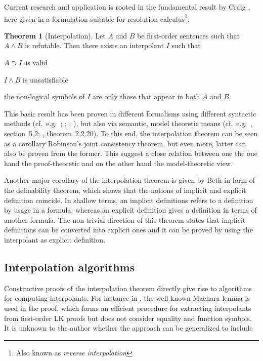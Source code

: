\documentclass[,%
			paper=a4,%
			DIV12,
			liststotoc,
			bibtotoc,
			draft=false,%
			numbers=noendperiod
			]{scrartcl}
\theoremstyle{definition}
\newtheorem{thm}{Theorem}
\begin{document}
Current research and application is rooted in the fundamental result by Craig \cite{craig57linear}, here given in a formulation suitable for resolution calculus\footnote{Also known as \emph{reverse interpolation}}:

\begin{thm}[Interpolation]
	Let $A$ and $B$ be first-order sentences such that $A \land B$ is refutable. 
	Then there exists an interpolant $I$ such that
	\begin{compactenum}
		\item $ A \supset I$ is valid 
		\item $I \land B$ is unsatisfiable
		\item the non-logical symbols of $I$ are only those that appear in both $A$ and $B$.
	\end{compactenum}
\end{thm}

This basic result has been proven in different formalisms using different syntactic methods (cf.~e.g.~\cite{craig57linear}; \cite{takeuti1987proof}; \cite{krajivcek1997interpolation}; \cite{Pudlak97}), but also via semantic, model theoretic means (cf.~e.g.~\cite{shoenfield1967mathematical}, section~5.2; \cite{chang1990model}, theorem~2.2.20).
To this end, the interpolation theorem can be seen as a corollary Robinson's joint consistency theorem, but even more, latter can also be proven from the former. 
This suggest a close relation between one the one hand the proof-theoretic and on the other hand the model-theoretic view.

Another major corollary of the interpolation theorem is given by Beth in form of the definability theorem, which shows that the notions of implicit and explicit definition coincide.
In shallow terms, an implicit definitions refers to a definition by usage in a formula, whereas an explicit definition gives a definition in terms of another formula.
The non-trivial direction of this theorem states that implicit definitions can be converted into explicit ones and it can be proved by using the interpolant as explicit definition.


\subsection{Interpolation algorithms}
\label{algos}

Constructive proofs of the interpolation theorem directly give rise to algorithms for computing interpolants.
For instance in \cite{takeuti1987proof}, the well known Maehara lemma is used in the proof, which forms an efficient procedure for extracting interpolants from first-order LK proofs but does not consider equality and function symbols.
It is unknown to the author whether the approach can be generalized to include
\end{document}
